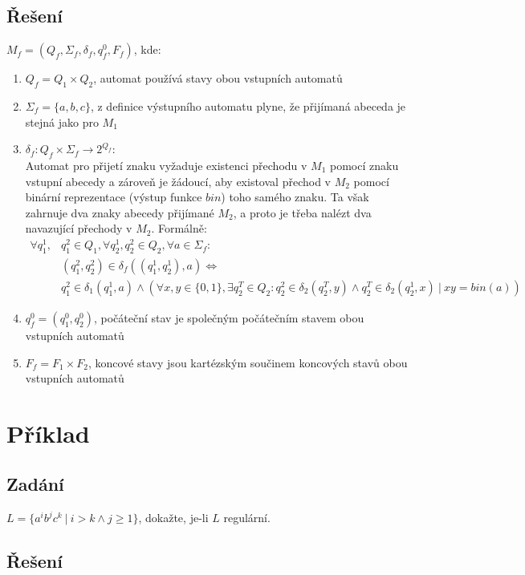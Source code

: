 \documentclass[11pt, a4paper]{article}
\begin{document}
\subsection*{Řešení}
$ M_f = (Q_f, \Sigma_f, \delta_f, q_f^0, F_f)$, kde:
\begin{enumerate}
	\item $ Q_f = Q_1 \times Q_2 $, automat používá stavy obou vstupních automatů
	\item $ \Sigma_f = \{a, b, c\}$, z definice výstupního automatu plyne, že přijímaná abeceda je stejná jako pro $ M_1 $
	\item $ \delta_f: Q_f \times \Sigma_f \rightarrow 2^{Q_f} $: \\
	      Automat pro přijetí znaku vyžaduje existenci přechodu v $ M_1 $ pomocí znaku vstupní abecedy a zároveň
	      je žádoucí, aby existoval přechod v $ M_2 $ pomocí binární reprezentace (výstup funkce $ bin $) toho
	      samého znaku. Ta však zahrnuje dva znaky abecedy přijímané $ M_2 $, a proto je třeba nalézt dva
	      navazující přechody v $ M_2 $. Formálně:
	      $\begin{aligned} \forall q_1^1, &q_1^2 \in Q_1, \forall q_2^1, q_2^2 \in Q_2, \forall a \in \Sigma_f: \\& (q_1^2, q_2^2) \in \delta_f((q_1^1, q_2^1), a) \Leftrightarrow \\& q_1^2 \in \delta_1(q_1^1, a) \wedge ( \forall x, y \in \{0, 1\}, \exists q_2^T \in Q_2: q_2^2 \in \delta_2(q_2^T, y) \wedge  q_2^T \in \delta_2(q_2^1, x)\ |\ xy = bin(a)) \end{aligned}$
	\item $ q_f^0 = (q_1^0, q_2^0) $, počáteční stav je společným počátečním stavem obou vstupních automatů
	\item $ F_f = F_1 \times F_2 $, koncové stavy jsou kartézským součinem koncových stavů obou vstupních automatů
\end{enumerate}

\section{Příklad}
\subsection*{Zadání}
$ L = \{a^ib^jc^k\ |\ i > k \wedge j \geq 1\}$, dokažte, je-li $L$ regulární.
\subsection*{Řešení}
\end{document}
